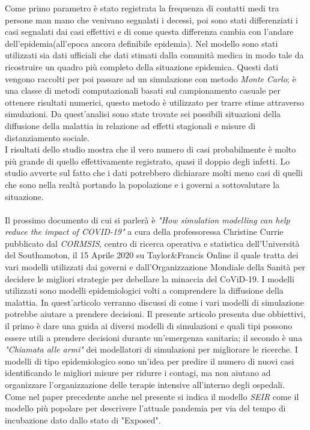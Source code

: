 \documentclass[12pt, openany]{book}
\begin{document}
		Come primo parametro è stato registrata la frequenza di contatti medi tra persone man mano che venivano segnalati i decessi, poi sono stati differenziati i casi segnalati dai casi effettivi e di come questa differenza cambia con l'andare dell'epidemia(all'epoca ancora definibile epidemia). Nel modello sono stati utilizzati sia dati ufficiali che dati stimati dalla comunità medica in modo tale da ricostruire un quadro più completo della situazione epidemica. Questi dati vengono raccolti per poi passare ad un simulazione con metodo \emph{Monte Carlo}; è una classe di metodi computazionali basati sul campionamento casuale per ottenere risultati numerici, questo metodo è utilizzato per trarre stime attraverso simulazioni.
		Da quest'analisi sono state trovate sei possibili situazioni della diffusione della malattia in relazione ad effetti stagionali e misure di distanziamento sociale.\\
		I risultati dello studio mostra che il vero numero di casi probabilmente è molto più grande di quello effettivamente registrato, quasi il doppio degli infetti. Lo studio avverte sul fatto che i dati potrebbero dichiarare molti meno casi di quelli che sono nella realtà portando la popolazione e i governi a sottovalutare la situazione.
		\\
		\\
		Il prossimo documento di cui si parlerà è  \emph{"How simulation modelling can help reduce the impact of COVID-19"} \cite{Simulazioni} a cura della professoressa Christine Currie pubblicato dal \emph{CORMSIS}, centro di ricerca operativa e statistica dell'Università del Southamoton, il 15 Aprile 2020 su Taylor\&Francis Online il quale tratta dei vari modelli utilizzati dai governi e dall'Organizzazione Mondiale della Sanità per decidere le migliori strategie per debellare la minaccia del CoViD-19. I modelli utilizzati sono modelli epidemiologici volti a comprendere la diffusione della malattia. In quest'articolo verranno discussi di come i vari modelli di simulazione potrebbe aiutare a prendere decisioni.
		Il presente articolo presenta due obbiettivi, il primo è dare una guida ai diversi modelli di simulazioni e quali tipi possono essere utili a prendere decisioni durante un'emergenza sanitaria; il secondo è una \emph{"Chiamata alle armi"} dei modellatori di simulazioni per migliorare le ricerche.
		I modelli di tipo epidemiologico sono un'idea per predire il numero di nuovi casi identificando le migliori misure per ridurre i contagi, ma non aiutano ad organizzare l'organizzazione delle terapie intensive all'interno degli ospedali. Come nel paper precedente anche nel presente si indica il modello \emph{SEIR} come il modello più popolare per descrivere l'attuale pandemia per via del tempo di incubazione dato dallo stato di "Exposed".\\
\end{document}

